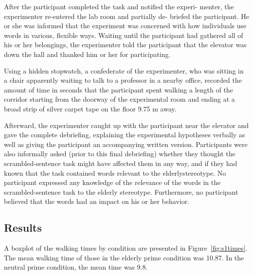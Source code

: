 \documentclass[a4paper,man,natbib,floatsintext]{apa6}\usepackage[]{graphicx}\usepackage[]{color}
\begin{document}
After the participant completed the task and notified the experi- menter, the experimenter re-entered the lab room and partially de- briefed the participant. He or she was informed that the experiment was concerned with how individuals use words in various, flexible ways. Waiting until the participant had gathered all of his or her belongings, the experimenter told the participant that the elevator was down the hall and thanked him or her for participating.

Using a hidden stopwatch, a confederate of the experimenter, who was sitting in a chair apparently waiting to talk to a professor in a nearby office, recorded the amount of time in seconds that the participant spent walking a length of the corridor starting from the doorway of the experimental room and ending at a broad strip of silver carpet tape on the floor 9.75 m away.

Afterward, the experimenter caught up with the participant near the elevator and gave the complete debriefing, explaining the experimental hypotheses verbally as well as giving the participant an accompanying written version. Participants were also informally asked (prior to this final debriefing) whether they thought the scrambled-sentence task might have affected them in any way, and if they had known that the task contained words relevant to the elderlystereotype. No participant expressed any knowledge of the relevance of the words in the scrambled-sentence task to the elderly stereotype. Furthermore, no participant believed that the words had an impact on his or her behavior.

\subsection{Results}




A boxplot of the walking times by condition are presented in Figure~\ref{fig:s1times}. The mean walking time of those in the elderly prime condition was 10.87. In the neutral prime condition, the mean time was 9.8.
\end{document}
